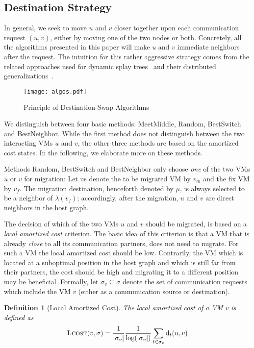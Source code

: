 \documentclass[conference]{IEEEtran}
\newtheorem{definition}{Definition}
\newcommand{\dist}{\text{d}}
\def\abs#1{\lvert #1 \rvert}
\newcommand{\LCost}{\text{\sc Lcost}}
\begin{document}
\subsection{Destination Strategy}

In general, we seek to move $u$ and $v$ closer together upon each communication request
$(u,v)$, either by moving one of the two nodes or both.
Concretely, all the algorithms presented in this paper will make $u$ and $v$ immediate
neighbors after the request. The intuition for this rather aggressive
strategy comes from the related approaches used for dynamic splay trees~\cite{Sleator:1985:SBS:3828.3835} and their
distributed generalizations~\cite{ipdps13}.
\begin{wrapfigure}{l}{0.6\columnwidth}
	\centering
\centering
				\texttt{[image: algos.pdf]}\\
				\caption{Principle of Destination-Swap Algorithms}
				\label{fig:dswap}	
\end{wrapfigure}
We distinguish between four basic methods: {\sc MeetMiddle}, {\sc Random}, {\sc BestSwitch} and {\sc BestNeighbor}.
While the first method does not distinguish between the two interacting VMs $u$ and $v$, the other three methods are based on the amortized cost states.
In the following, we elaborate more on these methods.

Methods {\sc Random}, {\sc BestSwitch} and {\sc BestNeighbor} only choose \emph{one} of the two VMs $u$ or $v$ for migration:
Let us denote the to be migrated VM by $v_m$  and the fix VM by $v_f$.  The migration destination, henceforth denoted by $\mu$, is
always selected to be a neighbor of $\lambda(v_f)$; accordingly, after the migration, $u$ and $v$ are direct neighbors in the host graph.

The decision of which of the two VMs $u$ and $v$ should be migrated, is based on a \emph{local amortized cost} criterion. The basic idea of this
criterion is that a VM that is already \emph{close} to all its communication partners, does not need to migrate. For such a VM the local amortized cost should be low. Contrarily, the VM which is located at a suboptimal position in the host graph and which is still far from their partners, the cost should be high and migrating it to a different position may be beneficial. Formally,
let $\sigma_{v}\subseteq \sigma$ denote the set of communication requests which include the VM $v$ (either as a communication source or destination).
\begin{definition}[Local Amortized Cost]\label{def:LocalAmortizeCost}
The \emph{local amortized cost} of a VM $v$ is defined as
\begin{align}
\LCost(v,\sigma) = \frac{1}{\abs{\sigma_{v}}} \frac{1}{\log (\abs{\sigma_{v}})} \sum\limits_{t\in \sigma_{v}} \dist_{t}(u,v)
\end{align}
\end{definition}
\end{document}
